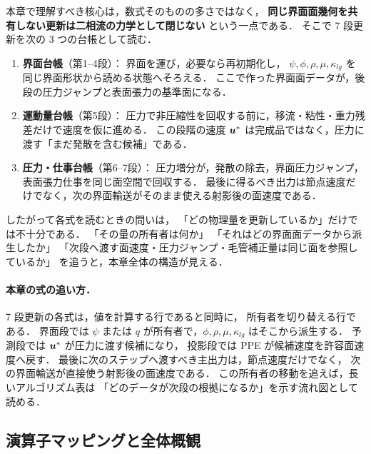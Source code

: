\begin{tcolorbox}[defbox, title={11章の理解モデル：3つの台帳を同じ面で閉じる}]
本章で理解すべき核心は，数式そのものの多さではなく，
\textbf{同じ界面面幾何を共有しない更新は二相流の力学として閉じない}
という一点である．
そこで 7 段更新を次の 3 つの台帳として読む．
\begin{enumerate}[noitemsep,leftmargin=2em]
  \item \textbf{界面台帳}（第1--4段）：
        界面を運び，必要なら再初期化し，
        $\psi,\phi,\rho,\mu,\kappa_{lg}$ を同じ界面形状から読める状態へそろえる．
        ここで作った界面面データが，後段の圧力ジャンプと表面張力の基準面になる．
  \item \textbf{運動量台帳}（第5段）：
        圧力で非圧縮性を回収する前に，移流・粘性・重力残差だけで速度を仮に進める．
        この段階の速度 $\bm{u}^*$ は完成品ではなく，圧力に渡す「まだ発散を含む候補」である．
  \item \textbf{圧力・仕事台帳}（第6--7段）：
        圧力増分が，発散の除去，界面圧力ジャンプ，表面張力仕事を同じ面空間で回収する．
        最後に得るべき出力は節点速度だけでなく，次の界面輸送がそのまま使える射影後の面速度である．
\end{enumerate}
したがって各式を読むときの問いは，
「どの物理量を更新しているか」だけでは不十分である．
「その量の所有者は何か」
「それはどの界面面データから派生したか」
「次段へ渡す面速度・圧力ジャンプ・毛管補正量は同じ面を参照しているか」
を追うと，本章全体の構造が見える．
\end{tcolorbox}

\paragraph{本章の式の追い方．}
7 段更新の各式は，値を計算する行であると同時に，
所有者を切り替える行である．
界面段では $\psi$ または $q$ が所有者で，$\phi,\rho,\mu,\kappa_{lg}$ はそこから派生する．
予測段では $\bm{u}^*$ が圧力に渡す候補になり，
投影段では PPE が候補速度を許容面速度へ戻す．
最後に次のステップへ渡すべき主出力は，節点速度だけでなく，
次の界面輸送が直接使う射影後の面速度である．
この所有者の移動を追えば，長いアルゴリズム表は
「どのデータが次段の根拠になるか」を示す流れ図として読める．

\subsection{演算子マッピングと全体概観}
\label{sec:algo_operator_map}

